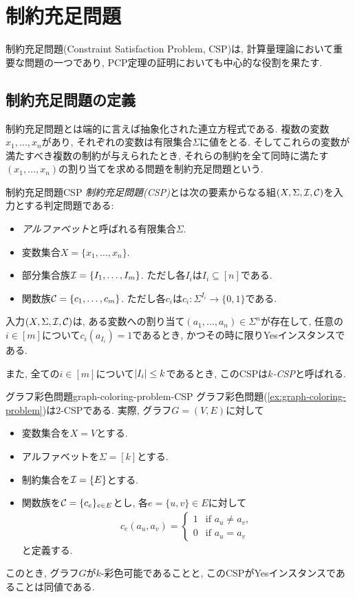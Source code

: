 \chapter{制約充足問題} \label{chap:CSP}
制約充足問題(Constraint Satisfaction Problem, CSP)は, 計算量理論において重要な問題の一つであり,
PCP定理の証明においても中心的な役割を果たす.

\section{制約充足問題の定義}
制約充足問題とは端的に言えば抽象化された連立方程式である.
複数の変数$x_1,\dots,x_n$があり, それぞれの変数は有限集合$\Sigma$に値をとる.
そしてこれらの変数が満たすべき複数の制約が与えられたとき, それらの制約を全て同時に満たす$(x_1,\dots,x_n)$の割り当てを求める問題を制約充足問題という.

\begin{definition}{制約充足問題}{CSP}
\emph{制約充足問題(CSP)}とは次の要素からなる組$(X,\Sigma,\mathcal{I},\mathcal{C})$を入力とする判定問題である:
\begin{itemize}
  \item \emph{アルファベット}と呼ばれる有限集合$\Sigma$.
  \item 変数集合$X=\{x_1,\dots,x_n\}$.
  \item 部分集合族$\mathcal{I}=\{I_1,\dots,I_m\}$. ただし各$I_i$は$I_i\subseteq[n]$である.
  \item 関数族$\mathcal{C}=\{c_1,\dots,c_m\}$. ただし各$c_i$は$c_i: \Sigma^{I_i}\to\{0,1\}$である.
\end{itemize}
入力$(X,\Sigma,\mathcal{I},\mathcal{C})$は,
ある変数への割り当て$(a_1,\dots,a_n)\in\Sigma^n$が存在して, 任意の$i\in[m]$について$c_i(a_{I_i})=1$であるとき, かつその時に限りYesインスタンスである.

また, 全ての$i\in[m]$について$\abs{I_i}\le k$であるとき, このCSPは\emph{$k$-CSP}と呼ばれる.
\end{definition}

\begin{example}{グラフ彩色問題}{graph-coloring-problem-CSP}
  グラフ彩色問題(\cref{ex:graph-coloring-problem})は$2$-CSPである.
  実際, グラフ$G=(V,E)$に対して
  \begin{itemize}
    \item 変数集合を$X=V$とする.
    \item アルファベットを$\Sigma=[k]$とする.
    \item 制約集合を$\mathcal{I}=\{E\}$とする.
    \item 関数族を$\mathcal{C}=\{c_e\}_{e\in E}$とし, 各$e=\{u,v\}\in E$に対して
    \begin{align*}
      c_e(a_u,a_v) = \begin{cases}
        1 & \text{if } a_u\neq a_v, \\
        0 & \text{if } a_u=a_v
      \end{cases}
    \end{align*}
    と定義する.
  \end{itemize}
  このとき, グラフ$G$が$k$-彩色可能であることと, このCSPがYesインスタンスであることは同値である.
\end{example}

